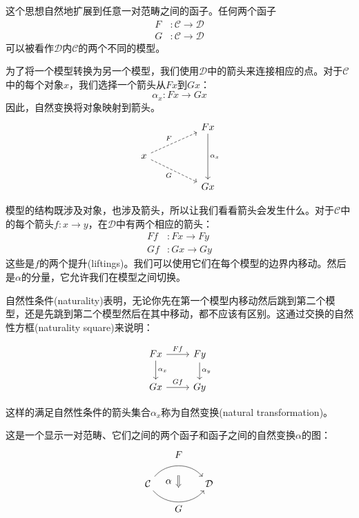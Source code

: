 \documentclass[DaoFP]{subfiles}
\begin{document}
    这个思想自然地扩展到任意一对范畴之间的函子。任何两个函子
    \begin{align*}
        F &\colon \mathcal{C} \to \mathcal{D} \\
        G &\colon \mathcal{C} \to \mathcal{D}
    \end{align*}
    可以被看作$\mathcal{D}$内$\mathcal{C}$的两个不同的模型。

    为了将一个模型转换为另一个模型，我们使用$\mathcal{D}$中的箭头来连接相应的点。对于$\mathcal{C}$中的每个对象$x$，我们选择一个箭头从$F x$到$G x$：
    \[ \alpha_x \colon F x \to G x \]
    因此，自然变换将对象映射到箭头。
    \[
        \begin{tikzcd}
            && F x
            \arrow[dd, "\alpha_x"]
            \\
            x
            \arrow[rru, dashed, "F"]
            \arrow[rrd, dashed, "G"']
            \\
            && G x
        \end{tikzcd}
    \]

    模型的结构既涉及对象，也涉及箭头，所以让我们看看箭头会发生什么。对于$\mathcal{C}$中的每个箭头$f \colon x \to y$，在$\mathcal{D}$中有两个相应的箭头：
    \begin{align*}
        F f &\colon F x \to F y \\
        G f &\colon G x \to G y
    \end{align*}
    这些是$f$的两个提升(liftings)。我们可以使用它们在每个模型的边界内移动。然后是$\alpha$的分量，它允许我们在模型之间切换。

    自然性条件(naturality)表明，无论你先在第一个模型内移动然后跳到第二个模型，还是先跳到第二个模型然后在其中移动，都不应该有区别。这通过交换的自然性方框(naturality square)来说明：

    \[
        \begin{tikzcd}
            F x
            \arrow[d, "\alpha_x"]
            \arrow[r, "F f"]
            &
            F y
            \arrow[d, "\alpha_y"]
            \\
            G x
            \arrow[r, "G f"]
            & G y
        \end{tikzcd}
    \]

    这样的满足自然性条件的箭头集合$\alpha_x$称为自然变换(natural transformation)。

    这是一个显示一对范畴、它们之间的两个函子和函子之间的自然变换$\alpha$的图：
    \[
        \begin{tikzcd}[column sep=huge]
            \mathcal{C}
            \arrow[bend left=50]{r}[name=U, label=above:$F$]{}
            \arrow[bend right=50]{r}[name=D, label=below:$G$]{}
            &
            \mathcal{D}
            \arrow[shorten <=10pt,shorten >=10pt,Rightarrow,to path={(U) -- node[label=left:$\alpha$] {} (D)}]{}
        \end{tikzcd}
    \]
\end{document}
